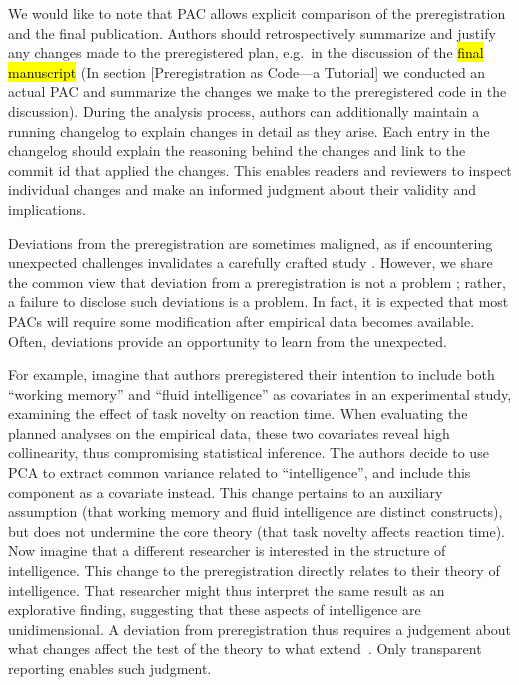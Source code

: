 \documentclass[psych,tutorial,accept,moreauthors,pdftex]{Definitions/mdpi}
\begin{document}
\begin{paracol}{2}
We would like to note that PAC allows explicit comparison of the
preregistration and the final publication. Authors should
retrospectively summarize and justify any changes made to the
preregistered plan, e.g.~in the discussion of the \hl{final manuscript}
({In section {[}Preregistration as Code---a Tutorial{]} we
  conducted an actual PAC and summarize the changes we make to the
  preregistered code in the discussion}). During the analysis process,
authors can additionally maintain a running changelog to explain changes
in detail as they arise. Each entry in the changelog should explain the
reasoning behind the changes and link to the commit id that applied the
changes. This enables readers and reviewers to inspect individual
changes and make an informed judgment about their validity and
implications.

Deviations from the preregistration are sometimes maligned, as if
encountering unexpected challenges invalidates a carefully crafted study
\citep{szollosi_is_2020}. However, we share the common view that
deviation from a preregistration is not a problem
\citep{nosekPreregistrationHardWorthwhile2019}; rather, a failure to
disclose such deviations is a problem. In fact, it is expected that most
PACs will require some modification after empirical data becomes
available. Often, deviations provide an opportunity to learn from the
unexpected.

For example, imagine that authors preregistered their intention to
include both ``working memory'' and ``fluid intelligence'' as covariates
in an experimental study, examining the effect of task novelty on
reaction time. When evaluating the planned analyses on the empirical
data, these two covariates reveal high collinearity, thus compromising
statistical inference. The authors decide to use PCA to extract common
variance related to ``intelligence'', and include this component as a
covariate instead. This change pertains to an auxiliary assumption (that
working memory and fluid intelligence are distinct constructs), but does
not undermine the core theory (that task novelty affects reaction time).
Now imagine that a different researcher is interested in the structure
of intelligence. This change to the preregistration directly relates to
their theory of intelligence. That researcher might thus interpret the
same result as an explorative finding, suggesting that these aspects of
intelligence are unidimensional. A deviation from preregistration thus
requires a judgement about what changes affect the test of the theory to
what extend~\citep{meehlTheoreticalRisksTabular1978}. Only transparent
reporting enables such judgment.


\end{paracol}
\end{document}
